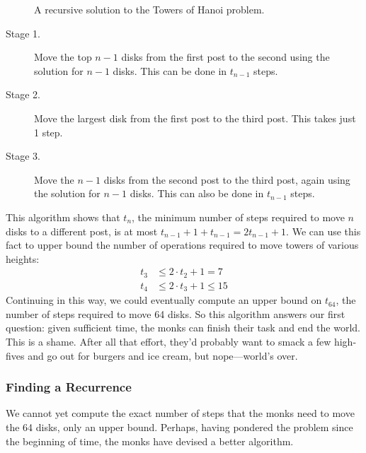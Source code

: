 \begin{figure}


\caption{A recursive solution to the Towers of Hanoi problem.}

\label{fig:10A3}

\end{figure}

\begin{description}

\item[Stage 1.]  Move the top $n-1$ disks from the first post to
  the second using the solution for $n - 1$ disks.  This can be done
  in $t_{n-1}$ steps.

\item[Stage 2.]  Move the largest disk from the first post to the
  third post.  This takes just 1 step.

\item[Stage 3.]  Move the $n-1$ disks from the second post to
  the third post, again using the solution for $n - 1$ disks.  This
  can also be done in $t_{n-1}$ steps.

\end{description}

This algorithm shows that $t_n$, the minimum number of steps required
to move $n$ disks to a different post, is at most $t_{n-1} + 1 +
t_{n-1} = 2 t_{n-1} + 1$.  We can use this fact to upper bound the
number of operations required to move towers of various heights:
\begin{align*}
t_3 & \leq 2 \cdot t_2 + 1 = 7 \\
t_4 & \leq 2 \cdot t_3 + 1 \leq 15
\end{align*}
Continuing in this way, we could eventually compute an upper bound on
$t_{64}$, the number of steps required to move 64 disks.  So this
algorithm answers our first question: given sufficient time, the monks
can finish their task and end the world.  This is a shame.  After all
that effort, they'd probably want to smack a few high-fives and go out
for burgers and ice cream, but nope---world's over.

\subsubsection{Finding a Recurrence}
We cannot yet compute the exact number of steps that the monks need
to move the 64 disks, only an upper bound.  Perhaps, having pondered
the problem since the beginning of time, the monks have devised a
better algorithm.

